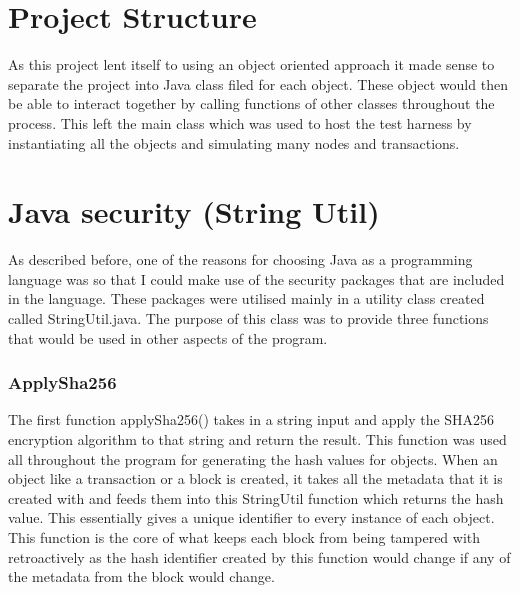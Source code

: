 \documentclass{l4proj}
\begin{document}
\section{Project Structure}
As this project lent itself to using an object oriented approach it made sense to separate the project into
Java class filed for each object. These object would then be able to interact together by calling functions
of other classes throughout the process. This left the main class which was used to host the test harness by
instantiating all the objects and simulating many nodes and transactions.


\section{Java security (String Util)}
As described before, one of the reasons for choosing Java as a programming language was so that I could make use
of the security packages that are included in the language. These packages were utilised mainly in a utility class created
called StringUtil.java. The purpose of this class was to provide three functions that would be used in other aspects
of the program. 
\subsubsection{ApplySha256}
The first function applySha256() takes in a string input and apply the SHA256 encryption
algorithm to that string and return the result. This function was used all throughout the program for generating
the hash values for objects. When an object like a transaction or a block is created, it takes all the metadata that
it is created with and feeds them into this StringUtil function which returns the hash value. This essentially gives
a unique identifier to every instance of each object. This function is the core of what keeps each block from being
tampered with retroactively as the hash identifier created by this function would change if any of the metadata from
the block would change.

\end{document}
